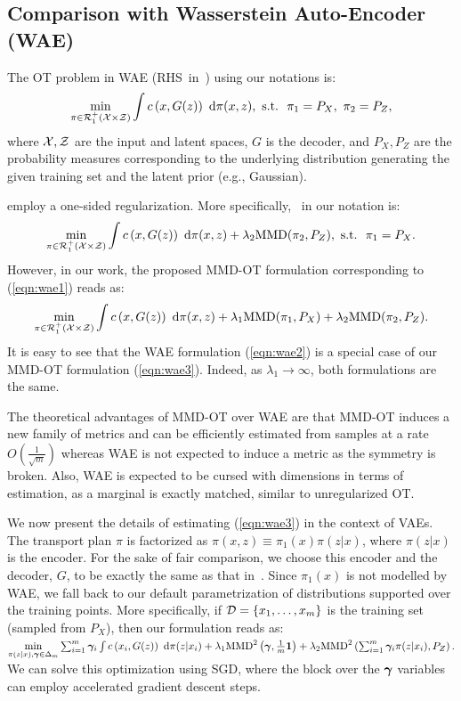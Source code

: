 \subsection{Comparison with Wasserstein Auto-Encoder (WAE)}\label{app:wae}
The OT problem in WAE (RHS~in~\citet[Theorem~(1)]{wae}) using our notations is:
\begin{equation}\label{eqn:wae1}
\min\limits_{\pi\in\calR^+_1(\calX\times\calZ)}\int c\left(x,G(z)\right)\ \textup{d}\pi(x,z), \textup{ s.t.}\ \ \pi_1=P_X,\ \pi_2=P_Z,
\end{equation}
where $\mathcal{X},\mathcal{Z}$ are the input and latent spaces, $G$ is the decoder, and $P_X,P_Z$ are the probability measures corresponding to the underlying distribution generating the given training set and the latent prior (e.g., Gaussian).

\cite{wae} employ a one-sided regularization. More specifically,~\citet[Eq. (4)]{wae} in our notation is:
\begin{equation}\label{eqn:wae2}
\min\limits_{\pi\in\mathcal{R}^+_1(\mathcal{X}\times\mathcal{Z})}\int c\left(x,G(z)\right)\ \textup{d}\pi(x,z) + \lambda_2 \textup{MMD}(\pi_2,P_Z), \textup{ s.t.}\ \ \pi_1=P_X.
\end{equation}
However, in our work, the proposed MMD-OT formulation corresponding to  (\ref{eqn:wae1}) reads as:
\begin{equation}\label{eqn:wae3}
\min\limits_{\pi\in\mathcal{R}^+_1(\mathcal{X}\times\mathcal{Z})}\int c\left(x,G(z)\right)\ \textup{d}\pi(x,z) + \lambda_1 \textup{MMD}(\pi_1,P_X) + \lambda_2 \textup{MMD}(\pi_2,P_Z).
\end{equation}
It is easy to see that the WAE formulation (\ref{eqn:wae2}) is a special case of our MMD-OT formulation (\ref{eqn:wae3}). Indeed, as $\lambda_1\rightarrow\infty$, both formulations are the same.

The theoretical advantages of MMD-OT over WAE are that MMD-OT induces a new family of metrics and can be efficiently estimated from samples at a rate $O(\frac{1}{\sqrt{m}})$ whereas WAE is not expected to induce a metric as the symmetry is broken. Also, WAE is expected to be cursed with dimensions in terms of estimation, as a marginal is exactly matched, similar to unregularized OT.

We now present the details of estimating (\ref{eqn:wae3}) in the context of VAEs. The transport plan $\pi$ is factorized as $\pi(x,z)\equiv\pi_1(x)\pi(z|x)$, where $\pi(z|x)$ is the encoder. For the sake of fair comparison, we choose this encoder and the decoder, $G$, to be exactly the same as that in~\cite{wae}. Since $\pi_1(x)$ is not modelled by WAE, we fall back to our default parametrization of distributions supported over the training points. More specifically, if $\mathcal{D}=\{x_1,\ldots,x_m\}$ is the training set (sampled from $P_X$), then our formulation reads as:
$\min\limits_{\pi(z|x),\bm{\gamma}\in\Delta_m}\sum_{i=1}^m\bm{\gamma}_i\int c\left(x_i,G(z)\right)\ \textup{d}\pi(z|x_i) + \lambda_1 \textup{MMD}^2\left(\bm{\gamma}, \frac{1}{m}\mathbf{1}\right) 
+ \lambda_2 \textup{MMD}^2\left(\sum_{i=1}^m\bm{\gamma}_i\pi(z|x_i),P_Z\right).$
We can solve this optimization using SGD, where the block over the $\bm{\gamma}$ variables can employ accelerated gradient descent steps.

